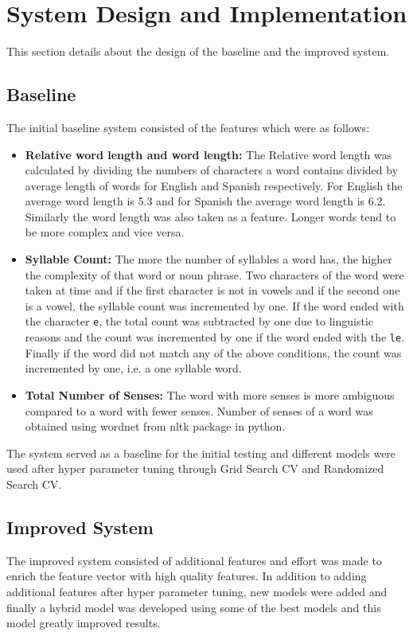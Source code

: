 \documentclass[10pt,a4paper]{article}
\begin{document}
\section{System Design and Implementation}
This section details about the design of the baseline and the improved system.
\subsection{Baseline}
The initial baseline system consisted of the features which were as follows:
\begin{itemize}
\item \textbf{Relative word length and word length:} 
The Relative word length was calculated by dividing the numbers of characters a word contains divided by average length of words for English and Spanish respectively. For English the average word length is 5.3 and for Spanish the average word length is 6.2. Similarly the word length was also taken as a feature. Longer words tend to be more complex and vice versa.
\item \textbf{Syllable Count:} 
The more the number of syllables a word has, the higher the complexity of that word or noun phrase. Two characters of the word were taken at time and if the first character is not in vowels and if the second one is a vowel, the syllable count was incremented by one. If the word ended with the character \texttt{e}, the total count was subtracted by one due to linguistic reasons and the count was incremented by one if the word ended with the \texttt{le}. Finally if the word did not match any of the above conditions, the count was incremented by one, i.e. a one syllable word. 
\item \textbf{Total Number of Senses:} 
The word with more senses is more ambiguous compared to a word with fewer senses. Number of senses of a word was obtained using wordnet from nltk package in python. \cite{[1]}
\end{itemize}


The system served as a baseline for the initial testing and different models were used after hyper parameter tuning through Grid Search CV and Randomized Search CV.
\subsection{Improved System}
The improved system consisted of additional features and effort was made to enrich the feature vector with high quality features. In addition to adding additional features after hyper parameter tuning, new models were added and finally a hybrid model was developed using some of the best models and this model greatly improved results. 
\end{document}
